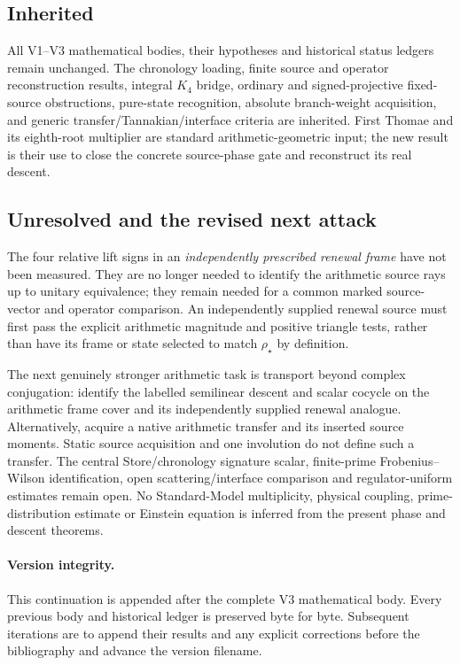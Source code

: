 \documentclass[11pt]{article}
\theoremstyle{definition}
\theoremstyle{remark}
\begin{document}
\subsection{Inherited}
All V1--V3 mathematical bodies, their hypotheses and historical status
ledgers remain unchanged. The chronology loading, finite source and
operator reconstruction results, integral $K_4$ bridge, ordinary and
signed-projective fixed-source obstructions, pure-state recognition,
absolute branch-weight acquisition, and generic transfer/Tannakian/interface
criteria are inherited. First Thomae and its eighth-root multiplier are
standard arithmetic-geometric input; the new result is their use to close
the concrete source-phase gate and reconstruct its real descent.

\subsection{Unresolved and the revised next attack}
The four relative lift signs in an \emph{independently prescribed renewal
frame} have not been measured. They are no longer needed to identify the
arithmetic source rays up to unitary equivalence; they remain needed for a
common marked source-vector and operator comparison. An independently
supplied renewal source must first pass the explicit arithmetic magnitude
and positive triangle tests, rather than have its frame or state selected
to match $\rho_\star$ by definition.

The next genuinely stronger arithmetic task is transport beyond complex
conjugation: identify the labelled semilinear descent and scalar cocycle on
the arithmetic frame cover and its independently supplied renewal analogue.
Alternatively, acquire a native arithmetic transfer and its inserted source
moments. Static source acquisition and one involution do not define such
a transfer. The central Store/chronology signature scalar, finite-prime
Frobenius--Wilson identification, open scattering/interface comparison and
regulator-uniform estimates remain open. No Standard-Model multiplicity,
physical coupling, prime-distribution estimate or Einstein equation is
inferred from the present phase and descent theorems.

\paragraph{Version integrity.}
This continuation is appended after the complete V3 mathematical body.
Every previous body and historical ledger is preserved byte for byte.
Subsequent iterations are to append their results and any explicit
corrections before the bibliography and advance the version filename.
\clearpage
\end{document}
